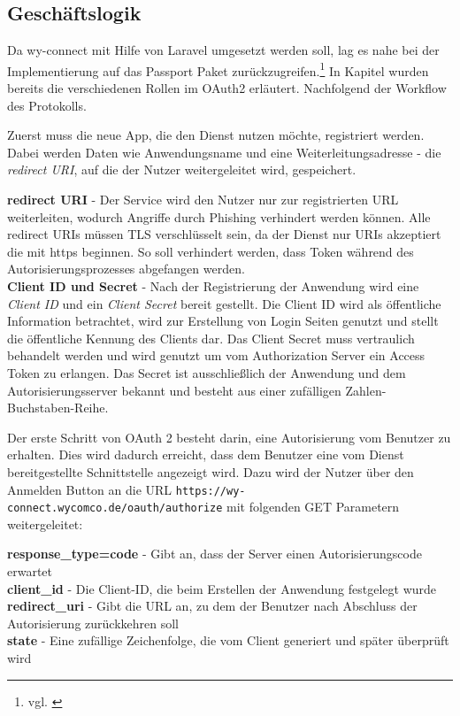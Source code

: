 
\subsection{Geschäftslogik}
\label{sec:Geschaeftslogik}

Da wy-connect mit Hilfe von Laravel umgesetzt werden soll, lag es nahe bei der Implementierung auf das Passport Paket zurückzugreifen.\footnote{vgl. \cite{Passport}}
In Kapitel  wurden bereits die verschiedenen Rollen im OAuth2 erläutert. Nachfolgend der Workflow des Protokolls.

Zuerst muss die neue App, die den Dienst nutzen möchte, registriert werden. Dabei werden Daten wie Anwendungsname und eine Weiterleitungsadresse - die \textit{redirect URI}, auf die der Nutzer weitergeleitet wird, gespeichert.

\textbf{redirect URI} -
Der Service wird den Nutzer nur zur registrierten URL weiterleiten, wodurch Angriffe durch \zB Phishing verhindert werden können. Alle redirect URIs müssen TLS verschlüsselt sein, da der Dienst nur URIs akzeptiert die mit \glqq https\grqq{}  beginnen. So soll verhindert werden, dass Token während des Autorisierungsprozesses abgefangen werden. \\
\textbf{Client ID und Secret} -
Nach der Registrierung der Anwendung wird eine \textit{Client ID} und ein \textit{Client Secret} bereit gestellt. Die Client ID wird als öffentliche Information betrachtet, wird zur Erstellung von Login Seiten genutzt und stellt die öffentliche Kennung des Clients dar. 
Das Client Secret muss vertraulich behandelt werden und wird genutzt um vom Authorization Server ein Access Token zu erlangen. Das Secret ist ausschließlich der Anwendung und dem Autorisierungsserver bekannt und besteht aus einer zufälligen Zahlen-Buchstaben-Reihe. 

Der erste Schritt von OAuth 2 besteht darin, eine Autorisierung vom Benutzer zu erhalten. Dies wird dadurch erreicht, dass dem Benutzer eine vom Dienst bereitgestellte Schnittstelle angezeigt wird. Dazu wird der Nutzer über den Anmelden Button an die URL \texttt{https://wy-connect.wycomco.de/oauth/authorize} mit folgenden GET Parametern weitergeleitet:

\textbf{response\_type=code} - Gibt an, dass der Server einen Autorisierungscode erwartet \\
\textbf{client\_id} - Die Client-ID, die beim Erstellen der Anwendung festgelegt wurde \\
\textbf{redirect\_uri} - Gibt die URL an, zu dem der Benutzer nach Abschluss der Autorisierung zurückkehren soll \\
\textbf{state} - Eine zufällige Zeichenfolge, die vom Client generiert und später überprüft wird

